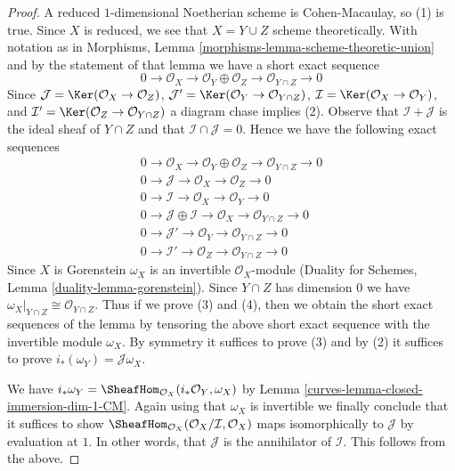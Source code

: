 \begin{proof}

A reduced $1$-dimensional Noetherian scheme is Cohen-Macaulay, so
(1) is true. Since $X$ is reduced, we see that $X = Y \cup Z$
scheme theoretically. With notation as in
Morphisms, Lemma \ref{morphisms-lemma-scheme-theoretic-union}
and by the statement of that lemma
we have a short exact sequence
$$
0 \to \mathcal{O}_X \to
\mathcal{O}_Y \oplus \mathcal{O}_Z \to \mathcal{O}_{Y \cap Z} \to 0
$$
Since $\mathcal{J} = \Ker(\mathcal{O}_X \to \mathcal{O}_Z)$,
$\mathcal{J}' = \Ker(\mathcal{O}_Y \to \mathcal{O}_{Y \cap Z})$,
$\mathcal{I} = \Ker(\mathcal{O}_X \to \mathcal{O}_Y)$, and
$\mathcal{I}' = \Ker(\mathcal{O}_Z \to \mathcal{O}_{Y \cap Z})$
a diagram chase implies (2).
Observe that $\mathcal{I} + \mathcal{J}$ is the ideal sheaf
of $Y \cap Z$ and that $\mathcal{I} \cap \mathcal{J} = 0$.
Hence we have the following exact sequences
\begin{align*}
0 \to \mathcal{O}_X \to \mathcal{O}_Y \oplus \mathcal{O}_Z \to
\mathcal{O}_{Y \cap Z} \to 0 \\
0 \to \mathcal{J} \to \mathcal{O}_X \to \mathcal{O}_Z \to 0 \\
0 \to \mathcal{I} \to \mathcal{O}_X \to \mathcal{O}_Y \to 0 \\
0 \to \mathcal{J} \oplus \mathcal{I} \to \mathcal{O}_X \to
\mathcal{O}_{Y \cap Z} \to 0 \\
0 \to \mathcal{J}' \to \mathcal{O}_Y \to \mathcal{O}_{Y \cap Z} \to 0 \\
0 \to \mathcal{I}' \to \mathcal{O}_Z \to \mathcal{O}_{Y \cap Z} \to 0
\end{align*}
Since $X$ is Gorenstein $\omega_X$ is an invertible $\mathcal{O}_X$-module
(Duality for Schemes, Lemma \ref{duality-lemma-gorenstein}).
Since $Y \cap Z$ has dimension $0$ we have
$\omega_X|_{Y \cap Z} \cong \mathcal{O}_{Y \cap Z}$.
Thus if we prove (3) and (4), then we obtain the short exact
sequences of the lemma by tensoring the above
short exact sequence with the invertible module $\omega_X$.
By symmetry it suffices to prove (3) and by
(2) it suffices to prove $i_*(\omega_Y) = \mathcal{J}\omega_X$.

\medskip\noindent
We have
$i_*\omega_Y = \SheafHom_{\mathcal{O}_X}(i_*\mathcal{O}_Y, \omega_X)$
by Lemma \ref{curves-lemma-closed-immersion-dim-1-CM}.
Again using that $\omega_X$ is invertible
we finally conclude that it suffices to show
$\SheafHom_{\mathcal{O}_X}(\mathcal{O}_X/\mathcal{I}, \mathcal{O}_X)$
maps isomorphically to $\mathcal{J}$ by evaluation at $1$.
In other words, that $\mathcal{J}$ is the annihilator of
$\mathcal{I}$. This follows from the above.
\end{proof}

